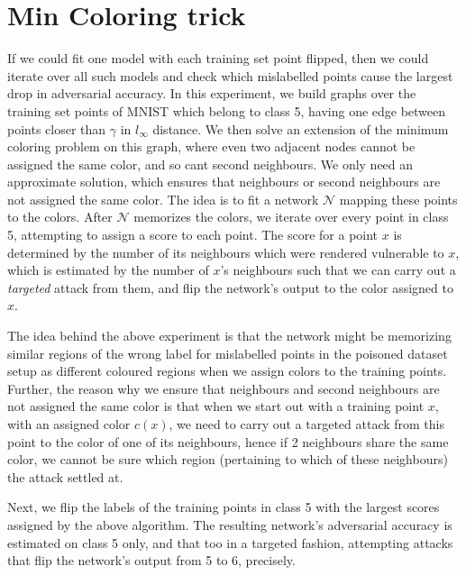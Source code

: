 \documentclass{ociamthesis}
\begin{document}
\section{Min Coloring trick}
If we could fit one model with each training set point flipped, then we could
iterate over all such models and check which mislabelled points cause the
largest drop in adversarial accuracy. In this experiment, we build graphs over
the training set points of MNIST which belong to class 5, having one edge
between points closer than $\gamma$ in $l_\infty$ distance. We then solve an
extension of the minimum coloring problem on this graph, where even two adjacent
nodes cannot be assigned the same color, and so cant second neighbours. We only
need an approximate solution, which ensures that neighbours or second neighbours
are not assigned the same color. The idea is to fit a network $\mathcal{N}$
mapping these points to the colors. After $\mathcal{N}$ memorizes the colors, we
iterate over every point in class 5, attempting to assign a score to each point.
The score for a point $x$ is determined by the number of its neighbours which
were rendered vulnerable to $x$, which is estimated by the number of $x$'s
neighbours such that we can carry out a \emph{targeted} attack from them, and
flip the network's output to the color assigned to $x$.

The idea behind the above experiment is that the network might be memorizing
similar regions of the wrong label for mislabelled points in the poisoned
dataset setup as different coloured regions when we assign colors to the
training points. Further, the reason why we ensure that neighbours and second
neighbours are not assigned the same color is that when we start out with a
training point $x$, with an assigned color $c(x)$, we need to carry out a
targeted attack from this point to the color of one of its neighbours, hence if
2 neighbours share the same color, we cannot be sure which region (pertaining to
which of these neighbours) the attack settled at.

Next, we flip the labels of the training points in class 5 with the largest
scores assigned by the above algorithm. The resulting network's adversarial
accuracy is estimated on class 5 only, and that too in a targeted fashion, attempting attacks that flip the network's output from 5 to 6, precisely.
\end{document}
